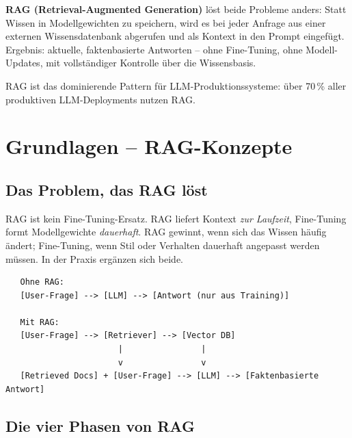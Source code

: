 \textbf{RAG (Retrieval-Augmented Generation)} löst beide Probleme anders: Statt Wissen in Modellgewichten zu speichern, wird es bei jeder Anfrage aus einer externen Wissensdatenbank abgerufen und als Kontext in den Prompt eingefügt. Ergebnis: aktuelle, faktenbasierte Antworten -- ohne Fine-Tuning, ohne Modell-Updates, mit vollständiger Kontrolle über die Wissensbasis.

RAG ist das dominierende Pattern für LLM-Produktionssysteme: über 70\,\% aller produktiven LLM-Deployments nutzen RAG.

\section{Grundlagen -- RAG-Konzepte}

\subsection{Das Problem, das RAG löst}

\begin{praxishinweis}
RAG ist kein Fine-Tuning-Ersatz. RAG liefert Kontext \textit{zur Laufzeit}, Fine-Tuning formt Modellgewichte \textit{dauerhaft}. RAG gewinnt, wenn sich das Wissen häufig ändert; Fine-Tuning, wenn Stil oder Verhalten dauerhaft angepasst werden müssen. In der Praxis ergänzen sich beide.
\end{praxishinweis}

\begin{verbatim}
   Ohne RAG:
   [User-Frage] --> [LLM] --> [Antwort (nur aus Training)]
   
   Mit RAG:
   [User-Frage] --> [Retriever] --> [Vector DB]
                       |                |
                       v                v
   [Retrieved Docs] + [User-Frage] --> [LLM] --> [Faktenbasierte Antwort]
\end{verbatim}

\subsection{Die vier Phasen von RAG}

